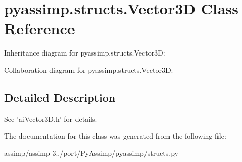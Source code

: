 \hypertarget{classpyassimp_1_1structs_1_1_vector3_d}{\section{pyassimp.\+structs.\+Vector3\+D Class Reference}
\label{classpyassimp_1_1structs_1_1_vector3_d}
}


Inheritance diagram for pyassimp.\+structs.\+Vector3\+D\+:


Collaboration diagram for pyassimp.\+structs.\+Vector3\+D\+:


\subsection{Detailed Description}
\begin{DoxyVerb}See 'aiVector3D.h' for details.
\end{DoxyVerb}
 

The documentation for this class was generated from the following file\+:\begin{DoxyCompactItemize}
\item 
assimp/assimp-\/3../port/\+Py\+Assimp/pyassimp/structs.\+py\end{DoxyCompactItemize}

